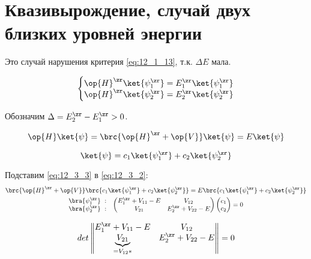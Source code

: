\section{Квазивырождение, случай двух близких уровней энергии}

Это случай нарушения критерия \eqref{eq:12_1_13}, т.к. $\Delta E$ мала.

\begin{equation}
\label{eq:12_3_1}
\left \{ 
\begin{matrix}
\op{H}^\zr \ket{\psi_1^\zr} = E_1^\zr \ket{\psi_1^\zr} \\
\op{H}^\zr \ket{\psi_2^\zr} = E_2^\zr \ket{\psi_2^\zr}
\end{matrix}
\right .
\end{equation}  

Обозначим $\Delta = E_2^\zr - E_1 ^\zr > 0$.

\begin{equation}
\label{eq:12_3_2}
\op{H} \ket{\psi} = \brc{\op{H}^\zr + \op{V}} \ket{\psi} = E \ket{\psi}
\end{equation}

\begin{equation}
\label{eq:12_3_3}
\ket{\psi} = c_1 \ket{\psi_1^\zr} + c_2 \ket{\psi_2^\zr} 
\end{equation}

Подставим \eqref{eq:12_3_3} в \eqref{eq:12_3_2}:
\begin{gather*}
\brc{\op{H}^\zr + \op{V}}\brc{c_1 \ket{\psi_1^\zr} + c_2 \ket{\psi_2^\zr}} = E \brc{c_1 \ket{\psi_1^\zr} + c_2 \ket{\psi_2^\zr}} \\
  \begin{matrix}
    \begin{matrix}
      \bra{\psi_1^\zr}~: \\
      \bra{\psi_2^\zr}~:
    \end{matrix} &
    \begin{pmatrix}
      E_1^\zr + V_{11} - E & V_{12} \\
      V_{21} & E_2^\zr + V_{22} - E
    \end{pmatrix} 
    \begin{pmatrix}
      c_1\\
      c_2
    \end{pmatrix} 
     = 0
  \end{matrix}
\end{gather*}

\begin{equation}
\label{eq:12_3_4}
det \left \| \begin{matrix}
E_1^\zr + V_{11} - E & V_{12} \\ 
\underbrace{V_{21}}_{=V_{12}*} & E_2^\zr + V_{22} - E
\end{matrix}
\right \| = 0
\end{equation}

